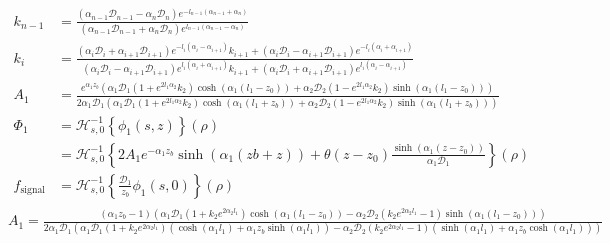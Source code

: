 \documentclass{article}
\newcommand{\diffusion}{\mathcal{D}}
\begin{document}
\begin{align*}
    k_{n-1} &= \frac{(\alpha_{n-1}\diffusion_{n-1}-\alpha_n \diffusion_n)e^{-l_{n-1}(\alpha_{n-1} + \alpha_n)}}{(\alpha_{n-1}\diffusion_{n-1}+\alpha_n \diffusion_n)e^{l_{n-1}(\alpha_{n-1} - \alpha_n)}} \\
    k_i &= \frac{
    (\alpha_i \diffusion_i + \alpha_{i+1} \diffusion_{i+1})e^{-l_i(\alpha_i - \alpha_{i+1})} k_{i+1} +
    (\alpha_i \diffusion_i - \alpha_{i+1} \diffusion_{i+1})e^{-l_i(\alpha_i + \alpha_{i+1})}
    }{
    (\alpha_i \diffusion_i - \alpha_{i+1} \diffusion_{i+1})e^{l_i(\alpha_i + \alpha_{i+1})} k_{i+1} +
    (\alpha_i \diffusion_i + \alpha_{i+1} \diffusion_{i+1})e^{l_i(\alpha_i - \alpha_{i+1})}} \\
    A_1 &= \frac{
    e^{\alpha_1 z_b} (\alpha_1 \diffusion_1 (1 + e^{2 l_1 \alpha_2} k_2) \cosh(\alpha_1 (l_1 - z_0)) +
        \alpha_2 \diffusion_2 (1 - e^{2 l_1 \alpha_2} k_2) \sinh(\alpha_1 (l_1 - z_0)))
    }{
    2 \alpha_1 \diffusion_1 (\alpha_1 \diffusion_1 (1 + e^{2 l_1 \alpha_2} k_2) \cosh(\alpha_1 (l_1 + z_b)) +
        \alpha_2 \diffusion_2 (1 - e^{2 l_1 \alpha_2} k_2) \sinh(\alpha_1 (l_1 + z_b)))
    } \\
    \Phi_1 &= \mathcal{H}^{-1}_{s,0}\left\lbrace{\phi_1(s, z)}\right\rbrace(\rho) \\
    &= \mathcal{H}^{-1}_{s,0}\left\lbrace{2 A_1 e^{-\alpha_1 z_b} \sinh(\alpha_1(zb + z)) + \theta(z-z_0)\frac{\sinh(\alpha_1(z-z_0))}{\alpha_1 \diffusion_1}}\right\rbrace(\rho) \\
    f_\text{signal} &= \mathcal{H}^{-1}_{s,0}\left\lbrace \frac{\diffusion_1}{z_b} \phi_1(s, 0) \right\rbrace(\rho) \\
\end{align*}
$
A_1 = \frac{\left(\alpha _1 z_b-1\right) \left(\alpha _1 \diffusion_1 \left(1+k_2 e^{2 \alpha _2 l_1}\right) \cosh \left(\alpha _1
 \left(l_1-z_0\right)\right)-\alpha _2 \diffusion_2 \left(k_2 e^{2 \alpha _2 l_1}-1\right) \sinh \left(\alpha _1 \left(l_1-z_0\right)\right)\right)
 }{2 \alpha _1 \diffusion_1 \left(\alpha _1 \diffusion_1 \left(1+k_2e^{2 \alpha _2 l_1}\right) \left(\cosh \left(\alpha _1 l_1\right)+\alpha _1 
 z_b \sinh \left(\alpha _1 l_1\right)\right)-\alpha _2 \diffusion_2 \left(k_2 e^{2 \alpha _2 l_1}-1\right) \left(\sinh 
 \left(\alpha _1 l_1\right)+\alpha _1 z_b \cosh \left(\alpha _1 l_1\right)\right)\right)}
$
\end{document}

